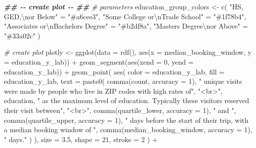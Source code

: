 \documentclass[
  11 pt,
  openany]{book}
\newenvironment{Shaded}{\begin{snugshade}}{\end{snugshade}}
\newcommand{\AttributeTok}[1]{\textcolor[rgb]{0.77,0.63,0.00}{#1}}
\newcommand{\CommentTok}[1]{\textcolor[rgb]{0.56,0.35,0.01}{\textit{#1}}}
\newcommand{\DecValTok}[1]{\textcolor[rgb]{0.00,0.00,0.81}{#1}}
\newcommand{\DocumentationTok}[1]{\textcolor[rgb]{0.56,0.35,0.01}{\textbf{\textit{#1}}}}
\newcommand{\FloatTok}[1]{\textcolor[rgb]{0.00,0.00,0.81}{#1}}
\newcommand{\FunctionTok}[1]{\textcolor[rgb]{0.00,0.00,0.00}{#1}}
\newcommand{\NormalTok}[1]{#1}
\newcommand{\OtherTok}[1]{\textcolor[rgb]{0.56,0.35,0.01}{#1}}
\newcommand{\SpecialCharTok}[1]{\textcolor[rgb]{0.00,0.00,0.00}{#1}}
\newcommand{\StringTok}[1]{\textcolor[rgb]{0.31,0.60,0.02}{#1}}
\begin{document}
\begin{Shaded}
\begin{Highlighting}[]
\DocumentationTok{\#\# {-}{-} create plot {-}{-} \#\#}
\CommentTok{\# parameters}
\NormalTok{education\_group\_colors }\OtherTok{\textless{}{-}}
  \FunctionTok{c}\NormalTok{(}
    \StringTok{"HS, GED,}\SpecialCharTok{\textbackslash{}n}\StringTok{or Below"} \OtherTok{=} \StringTok{"\#a6cee3"}\NormalTok{,}
    \StringTok{"Some College or}\SpecialCharTok{\textbackslash{}n}\StringTok{Trade School"}  \OtherTok{=} \StringTok{"\#1f78b4"}\NormalTok{,}
    \StringTok{"Associates or}\SpecialCharTok{\textbackslash{}n}\StringTok{Bachelors Degree"} \OtherTok{=} \StringTok{"\#b2df8a"}\NormalTok{,}
    \StringTok{"Masters Degree}\SpecialCharTok{\textbackslash{}n}\StringTok{or Above"} \OtherTok{=} \StringTok{"\#33a02c"}
\NormalTok{  )}

\CommentTok{\# create plot}
\NormalTok{plotly }\OtherTok{\textless{}{-}} \FunctionTok{ggplot}\NormalTok{(}\AttributeTok{data =} \FunctionTok{rdf}\NormalTok{(),}
                 \FunctionTok{aes}\NormalTok{(}\AttributeTok{x =}\NormalTok{ median\_booking\_window,}
                     \AttributeTok{y =}\NormalTok{ education\_y\_lab)) }\SpecialCharTok{+}
  \FunctionTok{geom\_segment}\NormalTok{(}\FunctionTok{aes}\NormalTok{(}\AttributeTok{xend =} \DecValTok{0}\NormalTok{, }\AttributeTok{yend =}\NormalTok{ education\_y\_lab)) }\SpecialCharTok{+}
  \FunctionTok{geom\_point}\NormalTok{(}
    \FunctionTok{aes}\NormalTok{(}
      \AttributeTok{color =}\NormalTok{ education\_y\_lab,}
      \AttributeTok{fill =}\NormalTok{ education\_y\_lab,}
      \AttributeTok{text =} \FunctionTok{paste0}\NormalTok{(}
        \FunctionTok{comma}\NormalTok{(count, }\AttributeTok{accuracy =} \DecValTok{1}\NormalTok{),}
        \StringTok{" unique visits were made by people who live in ZIP codes with high rates of"}\NormalTok{,}
        \StringTok{"\textless{}br\textgreater{}"}\NormalTok{, education, }
        \StringTok{" as the maximum level of education. Typically these visitors reserved their visit between"}\NormalTok{,}
        \StringTok{"\textless{}br\textgreater{}"}\NormalTok{, }\FunctionTok{comma}\NormalTok{(quartile\_lower, }\AttributeTok{accuracy =} \DecValTok{1}\NormalTok{), }\StringTok{" and "}\NormalTok{, }
        \FunctionTok{comma}\NormalTok{(quartile\_upper, }\AttributeTok{accuracy =} \DecValTok{1}\NormalTok{),}
        \StringTok{" days before the start of their trip, with a median booking window of "}\NormalTok{, }
        \FunctionTok{comma}\NormalTok{(median\_booking\_window, }\AttributeTok{accuracy =} \DecValTok{1}\NormalTok{),  }\StringTok{" days."}
\NormalTok{      )}
\NormalTok{    ),}
    \AttributeTok{size =} \FloatTok{3.5}\NormalTok{, }\AttributeTok{shape =} \DecValTok{21}\NormalTok{, }\AttributeTok{stroke =} \DecValTok{2}\NormalTok{ ) }\SpecialCharTok{+}

\end{Highlighting}
\end{Shaded}
\end{document}
